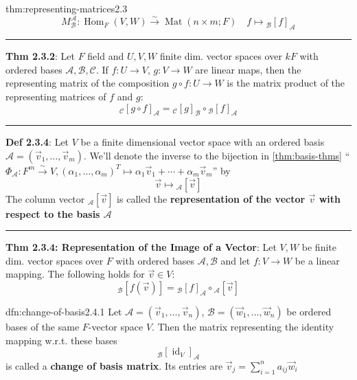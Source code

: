 \documentclass[landscape, 8pt]{extarticle}
\DeclareMathOperator{\Mat}{Mat}
\DeclareMathOperator{\Hom}{Hom}
\DeclareMathOperator{\id}{id}
\begin{document}
\begin{multicols}{3}
\begin{thm}{thm:representing-matrices}{2.3}
    \vspace{-10pt}
    \[M^{\mathcal{A}}_{\mathcal{B}} : \Hom_{F}(V, W) \xrightarrow{\sim} \Mat(n \times m; F) \quad f \mapsto {}_{\mathcal{B}}[f]_{\mathcal{A}}\]

    \vspace{-5pt}
    \noindent\rule{\textwidth}{0.2pt}
    \textbf{Thm 2.3.2}: Let $F$ field and $U,V,W$ finite dim. vector spaces over $kF$ with ordered bases $\mathcal{A}, \mathcal{B}, \mathcal{C}$. If $f : U \to V$, $g : V \to W$ are linear maps, then the representing matrix of the composition $g \circ f : U \to W$ is the matrix product of the representing matrices of $f$ and $g$:
    \[{}_{\mathcal{C}}[g \circ f]_{\mathcal{A}} = {}_{\mathcal{C}}[g]_{\mathcal{B}} \circ {}_{\mathcal{B}}[f]_{\mathcal{A}}\]

    \vspace{-5pt}
    \noindent\rule{\textwidth}{0.2pt}

    \textbf{Def 2.3.4}: Let $V$ be a finite dimensional vector space with an ordered basis $\mathcal{A} = (\vec{v}_{1},\dots,\vec{v}_{m})$. We'll denote the inverse to the bijection in \ref{thm:basis-thms} ``$\Phi_{\mathcal{A}} : F^{m} \xrightarrow{\sim} V, (\alpha_{1},\dots,\alpha_{m})^{T} \mapsto \alpha_{1}\vec{v}_{1} +\cdots + \alpha_{m}\vec{v}_{m}$'' by
    \[\vec{v} \mapsto {}_{\mathcal{A}}[\vec{v}]\]
    The column vector ${}_{\mathcal{A}}[\vec{v}]$ is called the \textbf{representation of the vector $\vec{v}$ with respect to the basis $\mathcal{A}$}

    \vspace{-5pt}
    \noindent\rule{\textwidth}{0.2pt}

    \textbf{Thm 2.3.4: Representation of the Image of a Vector}: Let $V,W$ be finite dim. vector spaces over $F$ with ordered bases $\mathcal{A}, \mathcal{B}$ and let $f : V \to W$ be a linear mapping. The following holds for $\vec{v}\in V$:
    \[{}_{\mathcal{B}}[f(\vec{v})] = {}_{\mathcal{B}}[f]_{\mathcal{A}}\circ {}_{\mathcal{A}}[\vec{v}]\]
\end{thm}

\vspace{-5pt}

\begin{dfn}{dfn:change-of-basis}{2.4.1}
    \vspace{-5pt}
    Let $\mathcal{A} = (\vec{v}_{1},\dots,\vec{v}_{n})$, $\mathcal{B} = (\vec{w}_{1},\dots,\vec{w}_{n})$ be ordered bases of the same $F$-vector space $V$. Then the matrix representing the identity mapping w.r.t. these bases
    \[{}_{\mathcal{B}}[\id_{V}]_{\mathcal{A}}\]
    is called a \textbf{change of basis matrix}. Its entries are $\vec{v}_{j} = \sum_{i = 1}^{n} a_{ij}\vec{w}_{i}$


\end{dfn}
\end{multicols}
\end{document}
